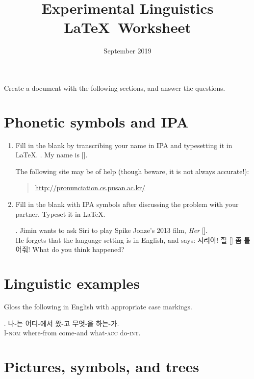 \documentclass{article}
\title{Experimental Linguistics \\ \LaTeX\ Worksheet}
\date{September 2019}
\begin{document}
\maketitle

\noindent Create a document with the following sections, and answer the questions.

\section{Phonetic symbols and IPA}

\begin{enumerate}
    \item Fill in the blank by transcribing your name in IPA and typesetting it in LaTeX. 
    \ex. My name is [].
    
    The following site may be of help (though beware, it is not always accurate!):
    
    \begin{quotation}
    \noindent 
    \url{http://pronunciation.cs.pusan.ac.kr/}  
    \end{quotation}
    
    \item Fill in the blank with IPA symbols after discussing the problem with your partner. Typeset it in LaTeX.
    
    \ex. Jimin wants to ask Siri to play Spike Jonze's 2013 film, \textit{Her} []. \\
    He forgets that the language setting is in English, 
    and says: 시리야! 헐 [] 
    좀 틀어줘! What do you think happened?
    
\end{enumerate}


\section{Linguistic examples}

\noindent Gloss the following in English with appropriate case markings.

\exg. 나-는 어디-에서 왔-고 무엇-을 하는-가. \\
I-\textsc{nom} where-from come-and what-\textsc{acc} do-\textsc{int}. \\

\section{Pictures, symbols, and trees}
\end{document}
